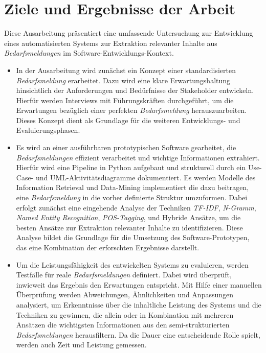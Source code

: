 \section{Ziele und Ergebnisse der Arbeit}
\label{sec:zieleundergebnis}
Diese Ausarbeitung präsentiert eine umfassende Untersuchung zur Entwicklung eines automatisierten Systems zur Extraktion relevanter Inhalte aus \emph{Bedarfsmeldungen} im Software-Entwicklungs-Kontext.
\begin{itemize}
	\item In der Ausarbeitung wird zunächst ein Konzept einer standardisierten \emph{Bedarfsmeldung} erarbeitet. Dazu wird eine klare Erwartungshaltung hinsichtlich der Anforderungen und Bedürfnisse der Stakeholder entwickeln. Hierfür werden Interviews mit Führungskräften durchgeführt, um die Erwartungen bezüglich einer \glqq{}perfekten\grqq{} \emph{Bedarfsmeldung} herauszuarbeiten. Dieses Konzept dient als Grundlage für die weiteren Entwicklungs- und Evaluierungsphasen.
	\item Es wird an einer ausführbaren prototypischen Software gearbeitet, die \emph{Bedarfsmeldungen} effizient verarbeitet und wichtige Informationen extrahiert. Hierfür wird eine Pipeline in Python aufgebaut und strukturell durch ein Use-Case- und UML-Aktivitätsdiagramme dokumentiert. Es werden Modelle des Information Retrieval und Data-Mining implementiert die dazu beitragen, eine \emph{Bedarfsmeldung} in die vorher definierte Struktur umzuformen. Dabei erfolgt zunächst eine eingehende Analyse der Techniken \emph{TF-IDF}, \emph{N-Gramm}, \emph{Named Entity Recognition}, \emph{POS-Tagging}, und Hybride Ansätze, um die besten Ansätze zur Extraktion relevanter Inhalte zu identifizieren. Diese Analyse bildet die Grundlage für die Umsetzung des Software-Prototypen, das eine Kombination der erforschten Ergebnisse darstellt.
	\item Um die Leistungsfähigkeit des entwickelten Systems zu evaluieren, werden Testfälle für reale \emph{Bedarfsmeldungen} definiert. Dabei wird überprüft, inwieweit das Ergebnis den Erwartungen entspricht. Mit Hilfe einer manuellen Überprüfung werden Abweichungen, Ähnlichkeiten und Anpassungen analysiert, um Erkenntnisse über die inhaltliche Leistung des Systems und die Techniken zu gewinnen, die allein oder in Kombination mit mehreren Ansätzen die wichtigsten Informationen aus den semi-strukturierten \emph{Bedarfsmeldungen} herausfiltern. Da die Dauer eine entscheidende Rolle spielt, werden auch Zeit und Leistung gemessen. %
\end{itemize}

